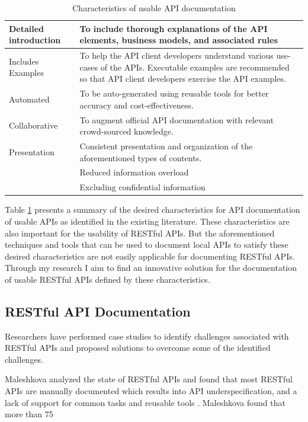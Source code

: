 \documentclass[11pt,oneside]{book}
\begin{document}
\begin{table}[!tbh]
  \caption{Characteristics of usable API documentation}
  \label{table:good_apis}
\begin{tabular}{|p{1.5in} | p{3in}|}
\hline
Detailed introduction &
To include thorough explanations of the API elements, business models, and associated rules \\
\hline
Includes Examples &
To help the API client developers understand various use-cases of the APIs. Executable examples are recommended so that API client developers exercise the API examples. \\
\hline
Automated &
To be auto-generated using reusable tools for better accuracy and cost-effectiveness. \\
\hline
Collaborative &
To augment official API documentation with relevant crowd-sourced knowledge. \\
\hline
Presentation &
Consistent presentation and organization of the aforementioned types of contents. \\
& Reduced information overload\\
& Excluding confidential information\\
\hline
\end{tabular}
\end{table}


Table \ref{table:good_apis} presents a summary of the desired characteristics for API documentation of usable APIs as identified in the existing literature. These characteristics are also important for the usability of RESTful APIs. But the aforementioned techniques and tools that can be used to document local APIs to satisfy these desired characteristics are not easily applicable for documenting RESTful APIs. Through my research I aim to find an innovative solution for the documentation of usable RESTful APIs defined by these characteristics.

\subsection{RESTful API Documentation} %
Researchers have performed case studies to identify challenges associated with RESTful APIs and proposed solutions to overcome some of the identified challenges.

Maleshkova analyzed the state of RESTful APIs and found that most RESTful APIs are manually documented which results into API underspecification, and a lack of support for common tasks and reusable tools \cite{Maleshkova_investigating}. Maleshkova found that more than 75%
\end{document}
